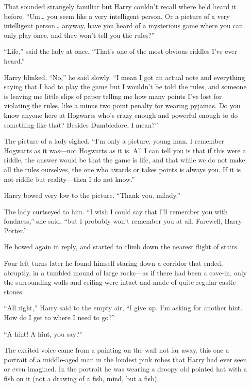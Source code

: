 That sounded strangely familiar but Harry couldn't recall where he'd
heard it before. ``Um\ldots{} you seem like a very intelligent person.
Or a picture of a very intelligent person\ldots{} anyway, have you heard
of a mysterious game where you can only play once, and they won't tell
you the rules?''

``Life,'' said the lady at once. ``That's one of the most obvious
riddles I've ever heard.''

Harry blinked. ``No,'' he said slowly. ``I mean I got an actual note and
everything saying that I had to play the game but I wouldn't be told the
rules, and someone is leaving me little slips of paper telling me how
many points I've lost for violating the rules, like a minus two point
penalty for wearing pyjamas. Do you know anyone here at Hogwarts who's
crazy enough and powerful enough to do something like that? Besides
Dumbledore, I mean?''

The picture of a lady sighed. ``I'm only a picture, young man. I
remember Hogwarts as it was---not Hogwarts as it is. All I can tell you
is that if this were a riddle, the answer would be that the game is
life, and that while we do not make all the rules ourselves, the one who
awards or takes points is always you. If it is not riddle but
reality---then I do not know.''

Harry bowed very low to the picture. ``Thank you, milady.''

The lady curtseyed to him. ``I wish I could say that I'll remember you
with fondness,'' she said, ``but I probably won't remember you at all.
Farewell, Harry Potter.''

He bowed again in reply, and started to climb down the nearest flight of
stairs.

Four left turns later he found himself staring down a corridor that
ended, abruptly, in a tumbled mound of large rocks---as if there had
been a cave-in, only the surrounding walls and ceiling were intact and
made of quite regular castle stones.

``All right,'' Harry said to the empty air, ``I give up. I'm asking for
another hint. How do I get to where I need to go?''

``A hint! A hint, you say?''

The excited voice came from a painting on the wall not far away, this
one a portrait of a middle-aged man in the loudest pink robes that Harry
had ever seen or even imagined. In the portrait he was wearing a droopy
old pointed hat with a fish on it (not a drawing of a fish, mind, but a
fish).

